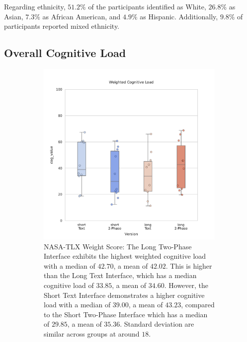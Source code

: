Regarding ethnicity, $51.2\%$ of the participants identified as White, $26.8\%$ as Asian, $7.3\%$ as African American, and $4.9\%$ as Hispanic. Additionally, $9.8\%$ of participants reported mixed ethnicity.

\subsection{Overall Cognitive Load}
\label{sec:cog}
\begin{figure}[ht]
    \centering
    \begin{subfigure}[b]{0.45\textwidth}
        \centering
        \includegraphics[width=\textwidth]{content/image/results/nasatlx_final_value.pdf}
        \caption{NASA-TLX Weight Score: The Long Two-Phase Interface exhibits the highest weighted cognitive load with a median of $42.70$, a mean of $42.02$. This is higher than the Long Text Interface, which has a median cognitive load of $33.85$, a mean of $34.60$. However, the Short Text Interface demonstrates a higher cognitive load with a median of $39.00$, a mean of $43.23$, compared to the Short Two-Phase Interface which has a median of $29.85$, a mean of $35.36$. Standard deviation are similar across groups at around $18$.}
        \label{fig:nasatlx-final1}
    \end{subfigure}
    \hfill
    \begin{subfigure}[b]{0.47\textwidth}

\end{subfigure}
\end{figure}

